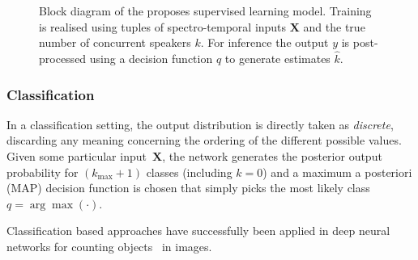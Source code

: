 \begin{figure}[t]
  \centering
  \begin{adjustbox}{width=.8\textwidth}
    
  \end{adjustbox}
\caption{%
Block diagram of the proposes supervised learning model.
Training is realised using tuples of spectro-temporal inputs \(\mathbf{X}\) and
the true number of concurrent speakers \(k\). For inference the output \(y\) is post-processed using a decision function \(q\) to generate estimates \(\hat{k}\).
}%
\label{fig:blockdiagram}
\end{figure}

\subsubsection{Classification}
In a classification setting, the output distribution is directly taken as \textit{discrete}, discarding any meaning concerning the ordering of the different possible values.
Given some particular input~$\mathbf{X}$, the network generates the posterior output probability for \((k_{\max} + 1)\) classes (including \(k=0\)) and a maximum a posteriori (MAP) decision function is chosen that simply picks the most likely class \(q = \arg\max(\cdot)\).

Classification based approaches have successfully been applied in deep neural networks for counting objects~\cite{segui15, zhang2015salient, khan16} in images.

